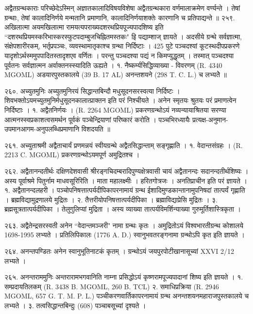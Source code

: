 अद्वैतग्रन्थकाराः
परिच्छेदेऽस्मिन् अज्ञातकालादिविषयविशेषा अद्वैतग्रन्थकारा वर्णमालाक्रमेण वर्ण्यन्ते । तेषां ग्रन्थाः, तेषां कालादिनिर्णये मन्मतानि प्रमाणानि, कालादिनिर्णयाशक्तेः कारणानि च प्रतिपाद्यन्ते ॥
२५९. अखिलात्मा
अयमखिलात्मा रामयत्यपराख्यदशरथप्रियपूज्यपादशिष्य इति ``दशरथप्रियमस्करिभास्करस्फुटपदाम्बुजचिह्नितमस्तकः" इि पद्याम्शाज् ज्ञायते । अदसीये ग्रन्थे सर्वज्ञात्मा, संक्षेपशारीरकम्, भर्तृप्रपञ्चः, व्यवस्थामातृकाश्च ग्रन्था निर्दिष्टाः । 425 पुटे पञ्चदश्यां कूटस्थदीपप्रकरणे यादृशोऽर्थस्ममुपपादितस्तादृशएव वर्णितः । परन्तु पञ्चदश्या पद्यं न किमप्युद्धृतम् । तस्मात् पञ्चदश्या पूर्वतनः सर्वज्ञात्मन अर्वाक्तनस्स्यादिति ऊह्यते ।
१. नैष्कर्म्यसिद्धिव्याख्या - विवरणम् (R. 4340 MGOML) अडयारपुस्तकालये (39 B. 17 AL) अनन्तशयने (298 T. C. L.) च लभ्यतेे ॥

२६०. अच्युतमुनिः
अच्युतमुनिरयं सिद्धान्तबिन्दौ मधुसूदनसरस्वत्या निर्दिष्टः । शिवभक्तोऽयमच्युतमुनिर्मधुसूदनकालात्प्राक्तन इति परं निश्चीयते । अनेन स्मृतयः श्रुतयः परं प्रमाणत्वेन निर्दिष्टाः ।
१. अद्वैतनिर्णयः । (R. 2264 MGOML)
प्रकरणग्रन्थोऽयं नव्यन्यायाश्रितया सरण्या आत्मनस्स्वप्रकाशत्वसमर्थन पूर्वकं पञ्चेन्द्रियाणां परिष्कारं करोति । पञ्चभिरध्यायैः प्रत्यक्ष-अनुमान-उपमानआगम-अनुपलब्धिप्रमाणानि विशदयति ॥

२६१. अच्युताश्रमी 
अद्वैताचार्यं प्रणमन्नयं स्वीयग्रन्थे अद्वैतसिद्धान्ताम् सङ्गृह्णाति ।
१. वेदान्तसंग्रहः । (R. 2213 C. MGOML) प्रकरणग्रन्थोऽयमपूर्ण अमुद्रितश्च ।

२६२. अद्वैतानन्दतीर्थः
दक्षिणदेशवासी श्रीरङ्गचिदम्बरादिपुण्यक्षेत्रवासी चायं अद्वैतानन्दः सदानन्दतीर्थशिष्यः । अस्य पूर्वाश्रमे पितुर्नाम माधवसूरिरिति । माता महालक्ष्मीः । हरितगोत्रजः । अनतिप्राचीन इति परं ज्ञायते ।
१. अद्वैतानन्दलहरी । पञ्चोपनिषत्तात्पर्यदीपिकापरनामायं ग्रन्थ ईशादिमुण्डकान्तानामुपनिषदां तात्पर्यं गृह्णाति । ब्रह्मविद्यामुद्रणालये मुद्रितः ।
२. तैत्तरीयोपनिषत्तात्पर्यदीपिका । ब्रह्माविद्याप्रेसि मुद्रितः ।
३. ब्रह्मसूत्रतात्पर्यदीपिका । तेलुगुलिप्यां मुद्रिता । अस्य व्याख्या तात्पर्यविमर्शिन्याख्या गुरुमूर्तिशास्त्रिकृता ।

२६३. अद्वैतेन्द्रसरस्वती
अनेन ``वेदान्तमञ्जरी" नामा ग्रन्थः कृतः । अमुद्रितोऽयं विश्वभारतीग्रन्थ कोशालये 1698-1995 लभ्यते । प्रतिलिपिकालः (1776 A. D.) स्वानुभवतरङ्गनामा ग्रन्थोऽपि कृत इति ज्ञायते ।

२६४. अनन्तपण्डितः 
अनेन स्वानुभूतिनाटकं कृतम् । ग्रन्थोऽयं जयपुरपोटीखानासूच्यां XXVI 2/12 लभ्यते ।

२६५. अनन्तराममुनिः
अन्तरारामभगवानिति नाम्ना प्रसिद्धोऽयं कृष्णरामपूज्यपादानां शिष्य इति ज्ञायते ।
१. सम्प्रदायतिलकम् (R. 3438 B. MGOML, 260 B. TCL)
२. समाधिप्रक्रिया (R. 2946 MGOML, 657 G. T. M. P. L.)
पञ्चीकरणवार्तिकापरनामायं ग्रन्थ अनन्तशयनमहाराजपुस्तकालये च लभ्यते ।
३. तत्वसिद्धान्तबिन्दुः (608) पञ्चाबसूच्यां दृश्यते ।

